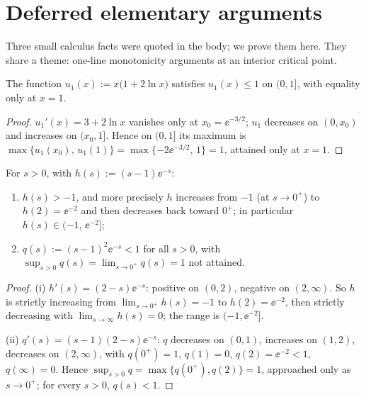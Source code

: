 \appendix

\section{Deferred elementary arguments}\label{sec:appendix}

Three small calculus facts were quoted in the body; we prove them
here. They share a theme: one-line monotonicity arguments at an
interior critical point.

\begin{lemma}\label{lem:u1}
The function $u_{1}(x) := x\bigl(1 + 2\ln x\bigr)$ satisfies
$u_{1}(x) \le 1$ on $(0, 1]$, with equality only at $x = 1$.
\end{lemma}

\begin{proof}
$u_{1}'(x) = 3 + 2\ln x$ vanishes only at $x_{0} = \ee^{-3/2}$; $u_{1}$
decreases on $(0, x_{0})$ and increases on $(x_{0}, 1]$. Hence on
$(0,1]$ its maximum is $\max\{u_{1}(x_{0}),\, u_{1}(1)\} =
\max\{-2\ee^{-3/2},\, 1\} = 1$, attained only at $x = 1$.
\end{proof}

\begin{lemma}\label{lem:q}
For $s > 0$, with $h(s) := (s-1)\ee^{-s}$:
\begin{enumerate}[label=\textup{(\roman*)}, leftmargin=2.2em]
\item $h(s) > -1$, and more precisely $h$ increases from $-1$ (at
$s \to 0^{+}$) to $h(2) = \ee^{-2}$ and then decreases back toward
$0^{+}$; in particular $h(s) \in (-1,\, \ee^{-2}]$;
\item $q(s) := (s-1)^{2}\ee^{-s} < 1$ for all $s > 0$, with
$\sup_{s>0} q(s) = \lim_{s \to 0^{+}} q(s) = 1$ not attained.
\end{enumerate}
\end{lemma}

\begin{proof}
(i) $h'(s) = (2-s)\ee^{-s}$: positive on $(0,2)$, negative on
$(2,\infty)$. So $h$ is strictly increasing from
$\lim_{s\to0^{+}} h(s) = -1$ to $h(2) = \ee^{-2}$, then strictly
decreasing with $\lim_{s\to\infty} h(s) = 0$; the range is
$(-1, \ee^{-2}]$.

(ii) $q'(s) = (s-1)(2-s)\ee^{-s}$: $q$ decreases on $(0,1)$, increases
on $(1,2)$, decreases on $(2,\infty)$, with $q(0^{+}) = 1$,
$q(1) = 0$, $q(2) = \ee^{-2} < 1$, $q(\infty) = 0$. Hence
$\sup_{s > 0} q = \max\{q(0^{+}), q(2)\} = 1$, approached only as
$s \to 0^{+}$; for every $s > 0$, $q(s) < 1$.
\end{proof}

